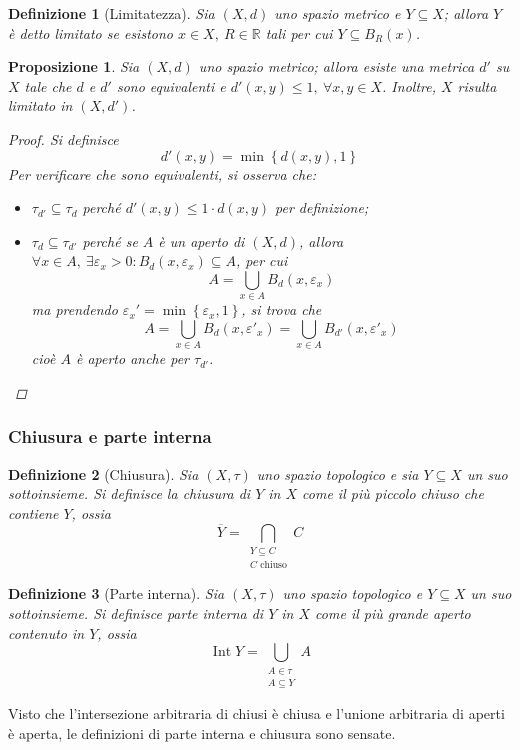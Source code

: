 \documentclass[12pt]{scrartcl}
\theoremstyle{style}
\newtheorem{definizione}{Definizione}[section]
\newtheorem{prop}{Proposizione}[section]
\numberwithin{equation}{subsection}
\begin{document}
\begin{definizione}
	[Limitatezza]
	Sia $(X,d)$ uno spazio metrico e $Y \subseteq X$; allora $Y$ \`e detto \textit{limitato} se esistono $x \in X, \ R \in \mathbb{R}$ tali per cui $Y \subseteq B_R(x)$.
\end{definizione}
\begin{prop}
	Sia $(X,d)$ uno spazio metrico; allora esiste una metrica $d'$ su $X$ tale che $d$ e $d'$ sono equivalenti e $d'(x,y)\le 1, \ \forall x,y \in X$.
	Inoltre, $X$ risulta limitato in $(X,d')$.
	\begin{proof}
		Si definisce 
		\[
		d'(x,y) = \min\left\{ d(x,y) , 1 \right\} 
		\] 
		Per verificare che sono equivalenti, si osserva che:
		\begin{itemize}
			\item $\tau _{d'} \subseteq \tau _d$ perch\'e $d'(x,y) \le 1 \cdot d(x,y)$ per definizione;
			\item $\tau _{d} \subseteq \tau _{d'} $ perch\'e se $A$ \`e un aperto di $(X,d)$, allora $\forall x \in A, \ \exists \varepsilon _x > 0 : B_d(x,\varepsilon _x) \subseteq A$, per cui
				\[
				A = \bigcup _{x \in A} B_d(x,\varepsilon _x)
				\] 
				ma prendendo $\varepsilon _x ' = \min \left\{ \varepsilon _x , 1 \right\} $, si trova che
				\[
				A = \bigcup _{x \in A}  B_d (x,\varepsilon '_x) = \bigcup _{x \in A} B_{d'} (x,\varepsilon '_x)
				\] 
				cio\`e $A$ \`e aperto anche per $\tau _{d'} $.
		\end{itemize}
	\end{proof}
\end{prop}
\subsubsection{Chiusura e parte interna}
\begin{definizione}
	[Chiusura]
	Sia $(X,\tau )$ uno spazio topologico e sia $Y\subseteq X$ un suo sottoinsieme.
	Si definisce la \textit{chiusura} di $Y$ in $X$ come il pi\`u piccolo chiuso che contiene $Y$, ossia
	\[
		\overline{Y}=\bigcap_{\substack{Y \subseteq C\\ C \text{ chiuso}}} C
	\] 
\end{definizione}
\begin{definizione}
	[Parte interna]
Sia $(X,\tau )$ uno spazio topologico e $Y\subseteq X$ un suo sottoinsieme.
Si definisce \textit{parte interna} di $Y$ in $X$ come il pi\`u grande aperto contenuto in $Y$, ossia
\[
	\operatorname{Int} Y = \bigcup_{\substack{A \in \tau \\ A\subseteq Y}} A
\] 
\end{definizione}
\noindent Visto che l'intersezione arbitraria di chiusi \`e chiusa e l'unione arbitraria di aperti \`e aperta, le definizioni di parte interna e chiusura sono sensate.
\end{document}
